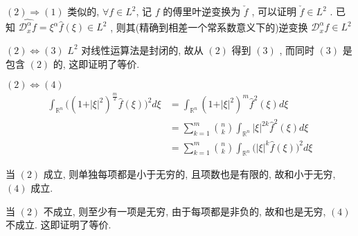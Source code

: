 \documentclass[a4paper, UTF8]{ctexart}				%
\numberwithin{equation}{section}				%
\begin{document}
        $(2) \Rightarrow (1)$ 类似的, $\forall f \in L^2$, 记 $f$ 的傅里叶逆变换为 $\check{f}$ , 可以证明 $\check{f} \in L^2$ . 已知 $\widehat{\mathcal{D}^\alpha_x f} = \xi^\alpha \hat{f}(\xi) \in L^2$ , 则其(精确到相差一个常系数意义下的)逆变换 $\mathcal{D}^\alpha_x f \in L^2$ 

        $(2) \Leftrightarrow (3)$ $L^2$ 对线性运算法是封闭的, 故从 $(2)$ 得到 $(3)$ , 而同时 $(3)$ 是包含 $(2)$ 的, 这即证明了等价.

        $(2) \Leftrightarrow (4)$
        \begin{equation*}
            \begin{split}
                \int^{}_{\mathbb{R}^n} \big((1 + \vert{\xi}\vert^2)^{\frac{m}{2}} \hat{f}(\xi)\big)^2 d \xi 
                & = \int^{}_{\mathbb{R}^n} (1 + \vert{\xi}\vert^2)^m \hat{f}^2(\xi) d \xi\\
                & = \sum^{m}_{k = 1} {n \choose k}\int^{}_{\mathbb{R}^n} \vert{\xi}\vert^{2k} \hat{f}^2(\xi) d \xi\\
                & = \sum^{m}_{k = 1} {n \choose k}\int^{}_{\mathbb{R}^n} \Big(\vert{\xi}\vert^{k} \hat{f}(\xi)\Big)^2 d \xi
            \end{split}
        \end{equation*}
        
        当 $(2)$ 成立, 则单独每项都是小于无穷的, 且项数也是有限的, 故和小于无穷, $(4)$ 成立. 
        
        当 $(2)$ 不成立, 则至少有一项是无穷, 由于每项都是非负的, 故和也是无穷, $(4)$ 不成立. 这即证明了等价.
        
        
        
\end{document}

